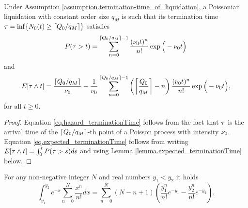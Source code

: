 \documentclass[10pt, article,table]{article}
\begin{document}
\begin{prop}\label{prop.terminationTime_poisson_and_constant-size}
 Under Assumption \ref{assumption.termination-time_of_liquidation}, a Poissonian liquidation with constant order size $q_{M}$ is such that its termination time $\terminationTime=\inf\lbrace \countingProc[0](t)\geq \lceil \metaorderSize / q_{M}\rceil \rbrace$ satisfies 
 \begin{equation}\label{eq.hazard_terminationTime}
  \Prob(\terminationTime >t ) 
  =
  \sum_{n=0}^{\lceil \metaorderSize / q_{M} \rceil -1 }
  \frac{(\baseRate_0 t)^{n}}{n!}\exp \Big(-\baseRate_{0} t \Big)
 \end{equation}
and 
\begin{equation}\label{eq.expected_terminationTime}
 \Expectation [\terminationTime \wedge t ]
 =
 \frac{\lceil \metaorderSize / q_{M} \rceil}{\baseRate_0}
 - \frac{1}{\baseRate_{0}}
  \sum_{n=0}^{\lceil \metaorderSize / q_{M} \rceil -1 }
  \left( \left\lceil \frac{\metaorderSize}{q_{M}}\right\rceil - n \right) 
  \frac{(\baseRate_0 t)^{n}}{n!}\exp \Big(-\baseRate_{0} t \Big),
\end{equation}
for all $t\geq 0$.
\end{prop}
\begin{proof}
 Equation \eqref{eq.hazard_terminationTime} follows from the fact that $\terminationTime$ is the arrival time of the $\lceil \metaorderSize/q_{M} \rceil$-th point of a Poisson process with  intensity $\baseRate_{0}$. Equation \eqref{eq.expected_terminationTime} follows from writing $
  \Expectation[\terminationTime \wedge t ] = 
  \intzerot \Prob(\terminationTime > s ) ds
 $
 and using Lemma \ref{lemma.expected_terminationTime} below.
\end{proof}
\begin{lemma}\label{lemma.expected_terminationTime}
 For any non-negative integer $N$ and real numbers $y_1<y_2$ it holds
 \begin{equation*}
  \int_{y_1}^{y_2}
  e^{-x}\sum_{n=0}^{N} \frac{x^{n}}{n!}dx
  =
  \sum_{n=0}^{N}
  (N-n+1)
  \left(
  \frac{y_{1}^{n}}{n!} e^{-y_1} -  \frac{y_{2}^{n}}{n!} e^{-y_2} 
  \right).
 \end{equation*}
\end{lemma}
\end{document}

